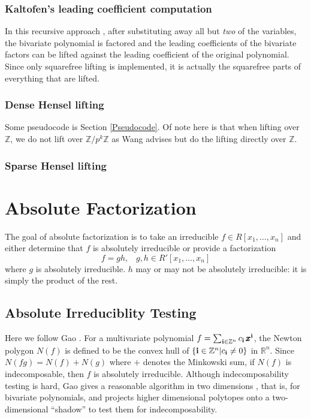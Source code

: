 \documentclass[11pt,reqno]{amsart}
\numberwithin{equation}{section}
\begin{document}
\subsubsection{Kaltofen's leading coefficient computation}
In this recursive approach \cite{KALTOFEN}, after substituting away all but
\emph{two} of the variables, the bivariate polynomial is factored and the
leading coefficients of the bivariate factors can be lifted against the leading
coefficient of the original polynomial. Since only squarefree lifting is
implemented, it is actually the squarefree parts of everything that are lifted.

\subsubsection{Dense Hensel lifting}
Some pseudocode is Section \ref{Pseudocode}. Of note here is
that when lifting over $\mathbb{Z}$, we do not lift over
$\mathbb{Z}/p^k\mathbb{Z}$ as Wang \cite{WANG} advises but do the lifting
directly over $\mathbb{Z}$.

\subsubsection{Sparse Hensel lifting}


\section{Absolute Factorization}

The goal of absolute factorization is to take an irreducible
$f \in R[x_1, \dots, x_n]$ and either determine that $f$ is absolutely
irreducible or provide a factorization
\begin{equation*}
f = g h \text{,} \quad g, h \in R'[x_1, \dots, x_n]
\end{equation*}
where $g$ is absolutely irreducible. $h$ may or may not be absolutely
irreducible: it is simply the product of the rest.

\subsection{Absolute Irreduciblity Testing}
Here we follow Gao \cite{GAO}. For a multivariate polynomial
$f = \sum_{\bold{i} \in \mathbb{Z}^n}{c_{\bold{i}} \, \pmb{x}^{\bold{i}}}$, the
Newton polygon $N(f)$ is defined to be the convex hull of
$\{\bold{i} \in \mathbb{Z}^n | c_{\bold{i}} \ne 0\}$ in $\mathbb{R}^n$.
Since $N(fg) = N(f) + N(g)$ where $+$ denotes the Minkowski sum, if $N(f)$ is
indecomposable, then $f$ is absolutely irreducible. Although indecomposability 
testing is hard, Gao gives a reasonable algorithm in two dimensions
\cite{GAO2}, that is, for bivariate polynomials, and projects higher
dimensional polytopes onto a two-dimensional ``shadow'' to test them for
indecomposability.
\end{document}
